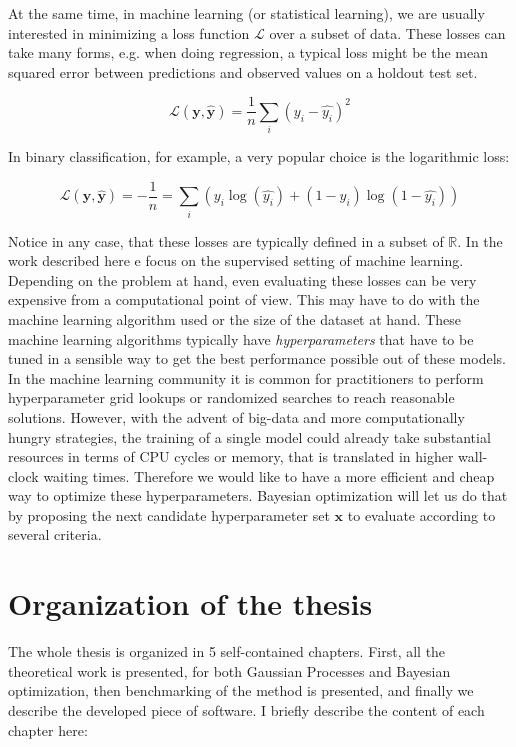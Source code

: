 \documentclass[10pt,a4paper,twoside]{book}
\begin{document}
At the same time, in machine learning (or statistical learning), we are usually interested in minimizing a loss function $\mathcal{L}$ over a subset of data. These losses can take many forms, e.g. when doing regression, a typical loss might be the mean squared error between predictions and observed values on a holdout test set.

\begin{equation}
\mathcal{L}(\boldsymbol{y}, \boldsymbol{\hat{y}}) = \dfrac{1}{n} \sum_i \left(y_i - \hat{y_i}\right)^2
\end{equation}

In binary classification, for example, a very popular choice is the logarithmic loss:

\begin{equation}
\mathcal{L}(\boldsymbol{y}, \boldsymbol{\hat{y}}) = -\dfrac{1}{n} = \sum_i \left(y_i \log(\hat{y_i}) + (1 - y_i)\log(1-\hat{y_i})\right)
\end{equation}

Notice in any case, that these losses are typically defined in a subset of $\mathbb{R}$. In the work described here e focus on the supervised setting of machine learning. Depending on the problem at hand, even evaluating these losses can be very expensive from a computational point of view. This may have to do with the machine learning algorithm used or the size of the dataset at hand. These machine learning algorithms typically have \textit{hyperparameters} that have to be tuned in a sensible way to get the best performance possible out of these models. In the machine learning community it is common for practitioners to perform hyperparameter grid lookups or randomized searches to reach reasonable solutions. However, with the advent of big-data and more computationally hungry strategies, the training of a single model could already take substantial resources in terms of CPU cycles or memory, that is translated in higher wall-clock waiting times. Therefore we would like to have a more efficient and cheap way to optimize these hyperparameters. Bayesian optimization will let us do that by proposing the next candidate hyperparameter set $\boldsymbol{x}$ to evaluate according to several criteria.

\section{Organization of the thesis}

The whole thesis is organized in 5 self-contained chapters. First, all the theoretical work is presented, for both Gaussian Processes and Bayesian optimization, then benchmarking of the method is presented, and finally we describe the developed piece of software. I briefly describe the content of each chapter here: \\
\end{document}
